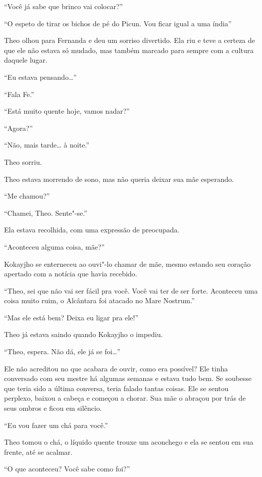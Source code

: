 ``Você já sabe que brinco vai colocar?''

``O espeto de tirar os bichos de pé do Picun. Vou ficar igual a uma
índia''

Theo olhou para Fernanda e deu um sorriso divertido. Ela riu e teve a
certeza de que ele não estava só mudado, mas também marcado para sempre
com a cultura daquele lugar.

``Eu estava pensando\ldots{}''

``Fala Fe.''

``Está muito quente hoje, vamos nadar?''

``Agora?''

``Não, mais tarde\ldots{} à noite.''

Theo sorriu.

\asterisc


Theo estava morrendo de sono, mas não queria deixar sua mãe esperando.

``Me chamou?''

``Chamei, Theo. Sente"-se.''

Ela estava recolhida, com uma expressão de preocupada.

``Aconteceu alguma coisa, mãe?''

Kokayjho se enterneceu ao ouvi"-lo chamar de mãe, mesmo estando seu
coração apertado com a notícia que havia recebido.

``Theo, sei que não vai ser fácil pra você. Você vai ter de ser forte.
Aconteceu uma coisa muito ruim, o Alcântara foi atacado no Mare
Nostrum.''

``Mas ele está bem? Deixa eu ligar pra ele!''

Theo já estava saindo quando Kokayjho o impediu.

``Theo, espera. Não dá, ele já se foi\ldots{}''

Ele não acreditou no que acabara de ouvir, como era possível? Ele tinha
conversado com seu mestre há algumas semanas e estava tudo bem. Se
soubesse que teria sido a última conversa, teria falado tantas coisas.
Ele se sentou perplexo, baixou a cabeça e começou a chorar. Sua mãe o
abraçou por trás de seus ombros e ficou em silêncio.

``Eu vou fazer um chá para você.''

Theo tomou o chá, o líquido quente trouxe um aconchego e ela se sentou
em sua frente, até se acalmar.

``O que aconteceu? Você sabe como foi?''

